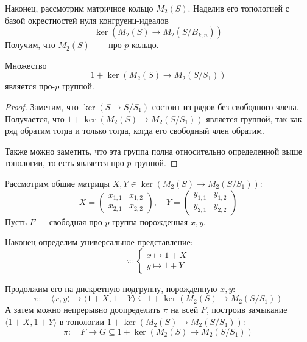     Наконец, рассмотрим матричное кольцо $M_2(S)$.
    Наделив его топологией с базой окрестностей нуля конгруенц-идеалов
    \[
        \ker{(M_2(S) \to M_2(S / B_{k,n}))}
    \]
    Получим, что $M_2(S)$ ~--- про-$p$ кольцо.
    \vskip 0.1in\noindent
    \begin{proposition}
        Множество
        \[1 + \ker{(M_2(S) \to M_2(S / S_1))}\]
        является про-$p$ группой.
    \end{proposition}
    \begin{proof}
        Заметим, что $\ker{(S\to S/S_1)}$ состоит из рядов без свободного члена.
        Получается, что $1 + \ker{(M_2(S) \to M_2(S / S_1))}$ является группой, так как ряд обратим тогда и только тогда, когда его свободный член обратим.

        Также можно заметить, что эта группа полна относительно определенной выше топологии, то есть является про-$p$ группой.
    \end{proof}
    Рассмотрим общие матрицы $X, Y \in \ker{(M_2(S) \to M_2(S / S_1))}$:
    \[
        X=
        \begin{pmatrix}
            x_{1,1} & x_{1,2} \\
            x_{2,1} & x_{2,2}
        \end{pmatrix},
        \quad
        Y=
        \begin{pmatrix}
            y_{1,1} & y_{1,2} \\
            y_{2,1} & y_{2,2}
        \end{pmatrix}
    \]
    Пусть $F$ --- свободная про-$p$ группа порожденная $x, y$.

    Наконец определим универсальное представление:
    \[
        \pi:
        \left\{
        \begin{array}{l}
            x \mapsto 1 + X \\
            y \mapsto 1 + Y
        \end{array}
        \right.
    \]

    Продолжим его на дискретную подгруппу, порожденную $x, y$:
    \[
        \pi: \quad \langle x, y \rangle \to \langle 1+X, 1+Y \rangle \subseteq 1 + \ker{(M_2(S) \to M_2(S / S_1))}
    \]
    А затем можно непрерывно доопределить $\pi$ на всей $F$, построив замыкание $\langle 1+X, 1+Y \rangle$ в топологии $1 + \ker{(M_2(S) \to M_2(S / S_1))}$:
    \[
        \pi:\quad F \to G \subseteq 1 + \ker{(M_2(S) \to M_2(S / S_1))}
    \]

